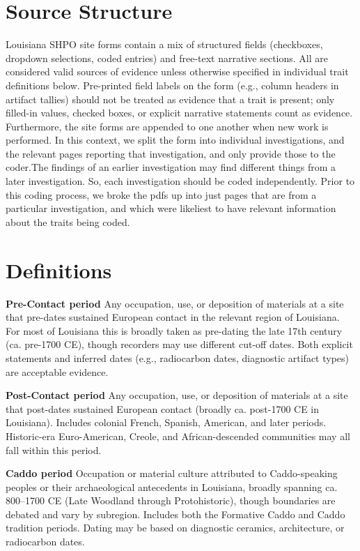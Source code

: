 \documentclass[
]{article}
\begin{document}
\section{Source Structure}\label{source-structure}

Louisiana SHPO site forms contain a mix of structured fields
(checkboxes, dropdown selections, coded entries) and free-text narrative
sections. All are considered valid sources of evidence unless otherwise
specified in individual trait definitions below. Pre-printed field
labels on the form (e.g., column headers in artifact tallies) should not
be treated as evidence that a trait is present; only filled-in values,
checked boxes, or explicit narrative statements count as evidence.
Furthermore, the site forms are appended to one another when new work is
performed. In this context, we split the form into individual
investigations, and the relevant pages reporting that investigation, and
only provide those to the coder.The findings of an earlier investigation
may find different things from a later investigation. So, each
investigation should be coded independently. Prior to this coding
process, we broke the pdfs up into just pages that are from a particular
investigation, and which were likeliest to have relevant information
about the traits being coded.

\section{Definitions}\label{definitions}

\textbf{Pre-Contact period} Any occupation, use, or deposition of
materials at a site that pre-dates sustained European contact in the
relevant region of Louisiana. For most of Louisiana this is broadly
taken as pre-dating the late 17th century (ca. pre-1700 CE), though
recorders may use different cut-off dates. Both explicit statements and
inferred dates (e.g., radiocarbon dates, diagnostic artifact types) are
acceptable evidence.

\textbf{Post-Contact period} Any occupation, use, or deposition of
materials at a site that post-dates sustained European contact (broadly
ca. post-1700 CE in Louisiana). Includes colonial French, Spanish,
American, and later periods. Historic-era Euro-American, Creole, and
African-descended communities may all fall within this period.

\textbf{Caddo period} Occupation or material culture attributed to
Caddo-speaking peoples or their archaeological antecedents in Louisiana,
broadly spanning ca. 800--1700 CE (Late Woodland through Protohistoric),
though boundaries are debated and vary by subregion. Includes both the
Formative Caddo and Caddo tradition periods. Dating may be based on
diagnostic ceramics, architecture, or radiocarbon dates.
\end{document}
